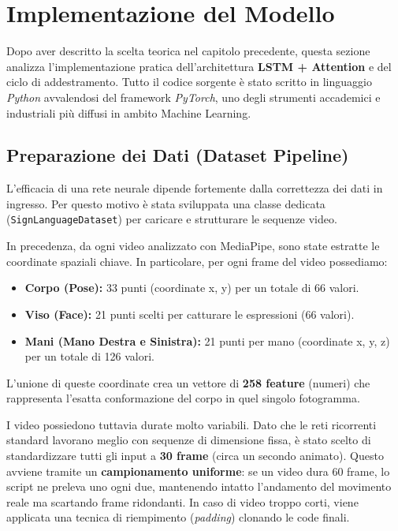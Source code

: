 
\section{Implementazione del Modello}

Dopo aver descritto la scelta teorica nel capitolo precedente, questa sezione analizza l'implementazione pratica dell'architettura \textbf{LSTM + Attention} e del ciclo di addestramento. Tutto il codice sorgente è stato scritto in linguaggio \textit{Python} avvalendosi del framework \textit{PyTorch}, uno degli strumenti accademici e industriali più diffusi in ambito Machine Learning.

\subsection{Preparazione dei Dati (Dataset Pipeline)}
L'efficacia di una rete neurale dipende fortemente dalla correttezza dei dati in ingresso. Per questo motivo è stata sviluppata una classe dedicata (\texttt{SignLanguageDataset}) per caricare e strutturare le sequenze video.

In precedenza, da ogni video analizzato con MediaPipe, sono state estratte le coordinate spaziali chiave. In particolare, per ogni frame del video possediamo:
\begin{itemize}
    \item \textbf{Corpo (Pose):} 33 punti (coordinate x, y) per un totale di 66 valori.
    \item \textbf{Viso (Face):} 21 punti scelti per catturare le espressioni (66 valori).
    \item \textbf{Mani (Mano Destra e Sinistra):} 21 punti per mano (coordinate x, y, z) per un totale di 126 valori.
\end{itemize}
L'unione di queste coordinate crea un vettore di \textbf{258 feature} (numeri) che rappresenta l'esatta conformazione del corpo in quel singolo fotogramma.

I video possiedono tuttavia durate molto variabili. Dato che le reti ricorrenti standard lavorano meglio con sequenze di dimensione fissa, è stato scelto di standardizzare tutti gli input a \textbf{30 frame} (circa un secondo animato). Questo avviene tramite un \textbf{campionamento uniforme}: se un video dura 60 frame, lo script ne preleva uno ogni due, mantenendo intatto l'andamento del movimento reale ma scartando frame ridondanti. In caso di video troppo corti, viene applicata una tecnica di riempimento (\textit{padding}) clonando le code finali.

